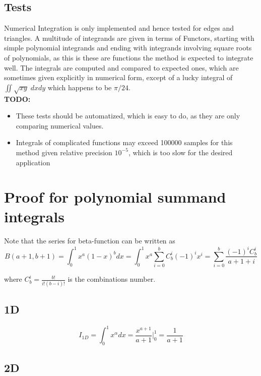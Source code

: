 \documentclass[12pt]{article}
\begin{document}
\subsection{Tests}

\noindent
Numerical Integration is only implemented and hence tested for edges and triangles. A multitude of integrands are given in terms of Functors, starting with simple polynomial integrands and ending with integrands involving square roots of polynomials, as this is these are functions the method is expected to integrate well. The integrals are computed and compared to expected ones, which are sometimes given explicitly in numerical form, except of a lucky integral of $\iint \sqrt{xy} \; dxdy$ which happens to be $\pi / 24$. \\

\textbf{TODO:}
\begin{itemize}
	\item These tests should be automatized, which is easy to do, as they are only comparing numerical values.
	\item Integrals of complicated functions may exceed 100000 samples for this method given relative precision $10^{-5}$, which is too slow for the desired application
\end{itemize}


\newpage
\appendix

\section{Proof for polynomial summand integrals}
\noindent
Note that the series for beta-function can be written as
\[B(a+1,b+1) = \int_0^1 x^a (1-x)^b dx = \int_0^1 x^a \sum_{i=0}^b C_b^i (-1)^i x^i = \sum_{i=0}^b \frac{(-1)^i C_b^i}{a+1+i}\]

\noindent
where $C_b^i = \frac{b!}{i!(b-i)!}$ is the combinations number.

\subsection{1D}

\begin{equation}
	I_{1D} = \int_0^1 x^{\alpha} dx = \frac{x^{a + 1}}{a + 1} \biggr |_0^1 = \frac{1}{a + 1}
\end{equation}

\subsection{2D}
\end{document}
